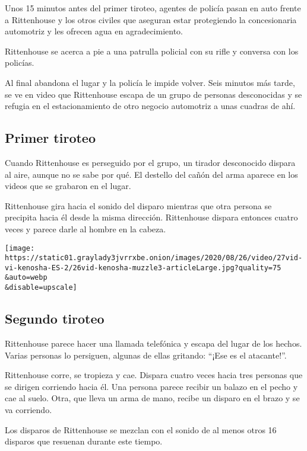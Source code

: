 Unos 15 minutos antes del primer tiroteo, agentes de policía pasan en
auto frente a Rittenhouse y los otros civiles que aseguran estar
protegiendo la concesionaria automotriz y les ofrecen agua en
agradecimiento.

Rittenhouse se acerca a pie a una patrulla policial con su rifle y
conversa con los policías.

Al final abandona el lugar y la policía le impide volver. Seis minutos
más tarde, se ve en video que Rittenhouse escapa de un grupo de personas
desconocidas y se refugia en el estacionamiento de otro negocio
automotriz a unas cuadras de ahí.

\hypertarget{primer-tiroteo}{%
\subsection{Primer tiroteo}\label{primer-tiroteo}}

Cuando Rittenhouse es perseguido por el grupo, un tirador desconocido
dispara al aire, aunque no se sabe por qué. El destello del cañón del
arma aparece en los videos que se grabaron en el lugar.

Rittenhouse gira hacia el sonido del disparo mientras que otra persona
se precipita hacia él desde la misma dirección. Rittenhouse dispara
entonces cuatro veces y parece darle al hombre en la cabeza.

\texttt{[image: https://static01.graylady3jvrrxbe.onion/images/2020/08/26/video/27vid-vi-kenosha-ES-2/26vid-kenosha-muzzle3-articleLarge.jpg?quality=75\\\&auto=webp\\\&disable=upscale]}

\hypertarget{segundo-tiroteo}{%
\subsection{Segundo tiroteo}\label{segundo-tiroteo}}

Rittenhouse parece hacer una llamada telefónica y escapa del lugar de
los hechos. Varias personas lo persiguen, algunas de ellas gritando:
``¡Ese es el atacante!''.

Rittenhouse corre, se tropieza y cae. Dispara cuatro veces hacia tres
personas que se dirigen corriendo hacia él. Una persona parece recibir
un balazo en el pecho y cae al suelo. Otra, que lleva un arma de mano,
recibe un disparo en el brazo y se va corriendo.

Los disparos de Rittenhouse se mezclan con el sonido de al menos otros
16 disparos que resuenan durante este tiempo.

